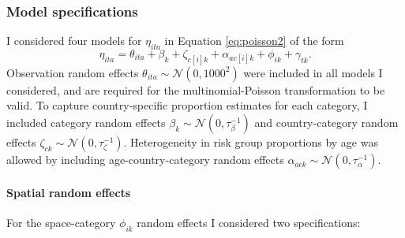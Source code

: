 \documentclass[a4paper, nobind]{templates/ociamthesis}
\begin{document}
\hypertarget{model-specifications}{%
\subsubsection{Model specifications}\label{model-specifications}}

I considered four models for \(\eta_{ita}\) in Equation \ref{eq:poisson2} of the form
\begin{equation}
\eta_{ita} = \theta_{ita} + \beta_k + \zeta_{c[i]k} + \alpha_{ac[i]k} + \phi_{ik} + \gamma_{tk}.
\end{equation}
Observation random effects \(\theta_{ita} \sim \mathcal{N}(0, 1000^2)\) were included in all models I considered, and are required for the multinomial-Poisson transformation to be valid.
To capture country-specific proportion estimates for each category, I included category random effects \(\beta_k \sim \mathcal{N}(0, \tau_\beta^{-1})\) and country-category random effects \(\zeta_{ck} \sim \mathcal{N}(0, \tau_\zeta^{-1})\).
Heterogeneity in risk group proportions by age was allowed by including age-country-category random effects \(\alpha_{ack} \sim \mathcal{N}(0, \tau_\alpha^{-1})\).

\hypertarget{spatial-random-effects-1}{%
\paragraph{Spatial random effects}\label{spatial-random-effects-1}}

For the space-category \(\phi_{ik}\) random effects I considered two specifications:
\end{document}
